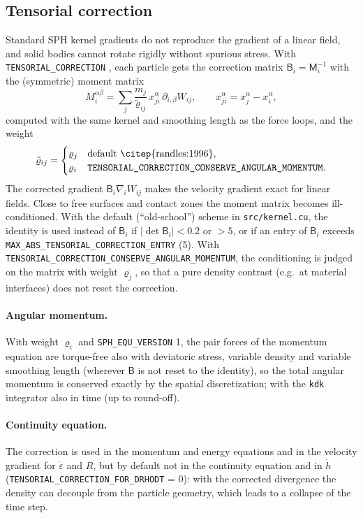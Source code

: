 \documentclass[10pt,fleqn,twoside]{article}
\newcommand{\code}[1]{\texttt{#1}}
\newcommand{\sw}[1]{\texttt{#1}}
\newcommand{\gradW}{\nabla_{\!i} W_{ij}}
\begin{document}
\subsection{Tensorial correction}
\label{sec:tc}
Standard SPH kernel gradients do not reproduce the gradient of a linear field, and solid bodies cannot rotate rigidly
without spurious stress. With \sw{TENSORIAL\_CORRECTION} \citep{randles:1996}, each particle gets the correction matrix
$\mathsf B_i = \mathsf M_i^{-1}$ with the (symmetric) moment matrix
\begin{equation}
 M_i^{\alpha\beta} = \sum_j \frac{m_j}{\tilde\varrho_{ij}}\,x_{ji}^\alpha\,\partial_{i,\beta}W_{ij},
 \qquad x_{ji}^\alpha = x_j^\alpha - x_i^\alpha,
\end{equation}
computed with the same kernel and smoothing length as the force loops, and the weight
\begin{equation}
 \label{eq:tcrho}
 \tilde\varrho_{ij} = \begin{cases} \varrho_j & \text{default \citep{randles:1996}},\\
 \varrho_i & \text{\sw{TENSORIAL\_CORRECTION\_CONSERVE\_ANGULAR\_MOMENTUM}.} \end{cases}
\end{equation}
The corrected gradient $\mathsf B_i\gradW$ makes the velocity gradient exact for linear fields. Close to free surfaces
and contact zones the moment matrix becomes ill-conditioned. With the default (``old-school'') scheme in
\code{src/kernel.cu}, the identity is used instead of $\mathsf B_i$ if $|\det\mathsf B_i| < 0.2$ or $> 5$, or if
an entry of $\mathsf B_i$ exceeds \code{MAX\_ABS\_TENSORIAL\_CORRECTION\_ENTRY} (5). With
\sw{TENSORIAL\_CORRECTION\_CONSERVE\_ANGULAR\_MOMENTUM}, the conditioning is judged on the matrix with weight
$\varrho_j$, so that a pure density contrast (e.g.\ at material interfaces) does not reset the correction.

\paragraph{Angular momentum.} With weight $\varrho_i$ and \sw{SPH\_EQU\_VERSION} 1, the pair forces of the momentum
equation are torque-free also with deviatoric stress, variable density and variable smoothing length (wherever
$\mathsf B$ is not reset to the identity), so the total angular momentum is conserved exactly by the spatial
discretization; with the \code{kdk} integrator also in time (up to round-off).

\paragraph{Continuity equation.} The correction is used in the momentum and energy equations and in the velocity
gradient for $\dot\varepsilon$ and $R$, but by default not in the continuity equation and in $\dot h$
(\sw{TENSORIAL\_CORRECTION\_FOR\_DRHODT} = 0): with the corrected divergence the density can decouple from the
particle geometry, which leads to a collapse of the time step.
\end{document}
